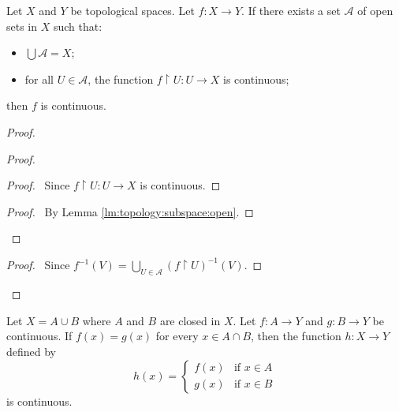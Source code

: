 \begin{thm}
  \label{thm:topology:continuous:local}
  Let $X$ and $Y$ be topological spaces.
  Let $f : X \rightarrow Y$. If there exists a set $\mathcal{A}$ of open
  sets in
  $X$ such that:
  \begin{itemize}
    \item $\bigcup \mathcal{A} = X$;
    \item for all $U \in \mathcal{A}$, the function $f \restriction U : U
    \rightarrow X$ is continuous;
  \end{itemize}
  then $f$ is continuous.
\end{thm}

\begin{proof}
  \pf
  \begin{proof}
    \begin{proof}
      \pf\ Since $f \restriction U : U \rightarrow X$ is continuous.
    \end{proof}
    \qedstep
    \begin{proof}
      \pf\ By Lemma \ref{lm:topology:subspace:open}.
    \end{proof}
  \end{proof}
  \qedstep
  \begin{proof}
    \pf\ Since $f^{-1}(V) = \bigcup_{U \in \mathcal{A}} (f \restriction
    U)^{-1}(V)$.
  \end{proof}
\end{proof}

\begin{thm}
  Let $X = A \cup B$ where $A$ and $B$ are closed in $X$. Let $f : A
  \rightarrow
  Y$ and $g : B \rightarrow Y$ be continuous. If $f(x) = g(x)$ for every $x
  \in A
  \cap B$, then the function $h : X \rightarrow Y$ defined by
  \[ h(x) = \begin{cases}
    f(x) & \text{if } x \in A \\
    g(x) & \text{if } x \in B
  \end{cases} \]
  is continuous.
\end{thm}

